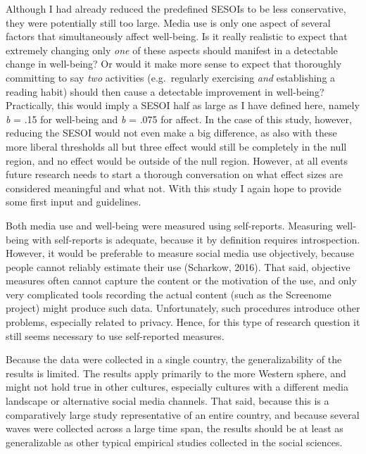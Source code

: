 \documentclass[
  english,
  man,mask,floatsintext]{apa6}
\begin{document}
Although I had already reduced the predefined SESOIs to be less conservative, they were potentially still too large.
Media use is only one aspect of several factors that simultaneously affect well-being.
Is it really realistic to expect that extremely changing only \emph{one} of these aspects should manifest in a detectable change in well-being?
Or would it make more sense to expect that thoroughly committing to say \emph{two} activities (e.g.~regularly exercising \emph{and} establishing a reading habit) should then cause a detectable improvement in well-being?
Practically, this would imply a SESOI half as large as I have defined here, namely \emph{b} = \textbar.15\textbar{} for well-being and \emph{b} = \textbar.075\textbar{} for affect.
In the case of this study, however, reducing the SESOI would not even make a big difference, as also with these more liberal thresholds all but three effect would still be completely in the null region, and no effect would be outside of the null region.
However, at all events future research needs to start a thorough conversation on what effect sizes are considered meaningful and what not.
With this study I again hope to provide some first input and guidelines.

Both media use and well-being were measured using self-reports.
Measuring well-being with self-reports is adequate, because it by definition requires introspection.
However, it would be preferable to measure social media use objectively, because people cannot reliably estimate their use (Scharkow, 2016).
That said, objective measures often cannot capture the content or the motivation of the use, and only very complicated tools recording the actual content (such as the Screenome project) might produce such data.
Unfortunately, such procedures introduce other problems, especially related to privacy.
Hence, for this type of research question it still seems necessary to use self-reported measures.

Because the data were collected in a single country, the generalizability of the results is limited.
The results apply primarily to the more Western sphere, and might not hold true in other cultures, especially cultures with a different media landscape or alternative social media channels.
That said, because this is a comparatively large study representative of an entire country, and because several waves were collected across a large time span, the results should be at least as generalizable as other typical empirical studies collected in the social sciences.
\end{document}
